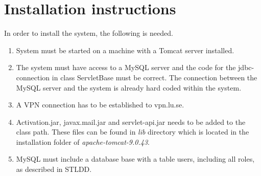 \documentclass{article}
\begin{document}
\section{Installation instructions}
In order to install the system, the following is needed.
\begin{enumerate}

    \item System must be started on a machine with a Tomcat server installed.
    
    \item  The system must have access to a MySQL server and the code for the
    jdbc-connection in class ServletBase must be correct. The connection between the MySQL server and the system is already hard coded within the system.
    
    \item A VPN connection has to be established to vpn.lu.se.
    
    \item Activation.jar, javax.mail.jar and servlet-api.jar needs to be added to the class path. These files can be found in \textit{lib} directory which is located in the installation folder of \textit{apache-tomcat-9.0.43}.
    
    \item MySQL must include a database base with a table users, including all roles, as described in STLDD.

\end{enumerate}

\end{document}
